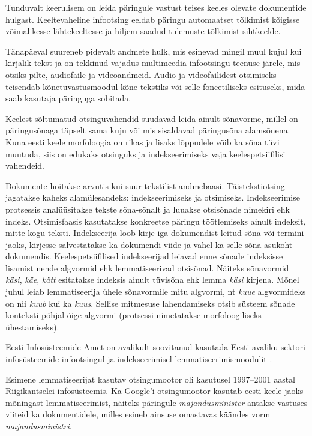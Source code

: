 \documentclass[]{../metanetpaper}
\begin{document}
\begin{multicols}{2}

Tunduvalt keerulisem on leida päringule vastust teises keeles olevate dokumentide hulgast. 
Keeltevaheline infootsing eeldab päringu automaatset tõlkimist kõigisse võimalikesse lähtekeeltesse ja hiljem saadud tulemuste tõlkimist sihtkeelde. 

Tänapäeval suureneb pidevalt andmete hulk, mis esinevad mingil muul kujul kui kirjalik tekst ja on tekkinud vajadus multimeedia infootsingu teenuse järele, mis otsiks pilte, audiofaile ja videoandmeid. 
Audio-ja videofailidest otsimiseks teisendab kõnetuvastusmoodul kõne tekstiks või selle foneetiliseks esituseks, mida saab kasutaja päringuga sobitada. 

Keelest sõltumatud otsinguvahendid suudavad leida ainult sõnavorme, millel on päringusõnaga täpselt sama kuju või mis sisaldavad päringusõna alamsõnena. 
Kuna eesti keele morfoloogia on rikas ja lisaks lõppudele võib ka sõna tüvi muutuda, siis on edukaks otsinguks ja indekseerimiseks vaja keelespetsiifilisi vahendeid. 

Dokumente hoitakse arvutis kui suur tekstilist andmebaasi. 
Täistekstiotsing jagatakse kaheks alamülesandeks: indekseerimiseks ja otsimiseks. 
Indekseerimise protsessis analüüsitakse tekste sõna-sõnalt ja luuakse otsisõnade nimekiri ehk indeks. 
Otsimisfaasis kasutatakse konkreetse päringu töötlemiseks ainult indeksit, mitte kogu teksti. 
Indekseerija loob kirje iga dokumendist leitud sõna või termini jaoks, kirjesse salvestatakse ka dokumendi viide ja vahel ka selle sõna asukoht dokumendis.
Keelespetsiifilised indekseerijad leiavad enne sõnade indeksisse lisamist nende algvormid ehk lemmatiseerivad otsisõnad. 
Näiteks sõnavormid \textit{käsi}, \textit{käe}, \textit{kätt} esitatakse indeksis ainult tüvisõna ehk lemma \textit{käsi} kirjena. 
Mõnel juhul leiab lemmatiseerija ühele sõnavormile mitu algvormi, nt \textit{kuue} algvormideks on nii \textit{kuub} kui ka \textit{kuus}. 
Sellise mitmesuse lahendamiseks otsib süsteem sõnade konteksti põhjal õige algvormi (protsessi nimetatakse morfoloogiliseks ühestamiseks). 


Eesti Infosüsteemide Amet on avalikult soovitanud kasutada Eesti avaliku sektori infosüsteemide infootsingul ja indeksee\-rimisel lemmatiseerimismoodulit \cite{RIA}.

Esimene lemmatiseerijat kasutav otsingumootor oli kasutusel 1997--2001 aastal Riigi\-kantselei infosüsteemis.
Ka Google’i otsingu\-mootor kasutab eesti keele jaoks mõningast lemmatiseerimist, näiteks päringule \textit{majandusminister} antakse vastuses viiteid ka dokumentidele, milles esineb ainsuse omastavas käändes vorm \textit{majandus\-ministri}.


\end{multicols}
\end{document}
